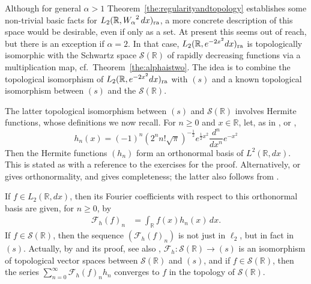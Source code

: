 \documentclass[12pt, reqno]{amsart}
\numberwithin{equation}{section}
\theoremstyle{plain}
\theoremstyle{definition}
\begin{document}
Although for general $\alpha>1$ Theorem~\ref{the:regularityandtopology} establishes some non-trivial basic facts for ${L_2({{\mathbb R}},{W_\alpha}^2\,dx)_{\textup{ra}}}$, a more concrete description of this space would be desirable, even if only as a set. At present this seems out of reach, but there is an exception if $\alpha=2$. In that case, ${L_2({{\mathbb R}},e^{-2x^2}dx)_{\textup{ra}}}$ is topologically isomorphic with the Schwartz space ${{\mathcal S}}({{\mathbb R}})$ of rapidly decreasing functions via a multiplication map, cf.\ Theorem~\ref{the:alphaistwo}. The idea is to combine the topological isomorphism of ${L_2({{\mathbb R}},e^{-2x^2}dx)_{\textup{ra}}}$ with $(s)$ and a known topological isomorphism between $(s)$ and the ${{\mathcal S}}({{\mathbb R}})$.

The latter topological isomorphism between $(s)$ and ${{\mathcal S}}({{\mathbb R}})$ involves Hermite functions, whose definitions we now recall.
For $n\geq 0$ and $x\in{{\mathbb R}}$, let, as in \cite[p.~142]{ReeSim}, or \cite[(1.1.2) and (1.1.18)]{Tha},
\begin{equation}\label{eq:hermitefunctionsdef}
h_n(x)=(-1)^n\left( 2^n n! \sqrt{\pi} \right)^{-\frac{1}{2}}e^{\frac{1}{2}x^2}\frac{d^n}{dx^n}e^{-x^2}
\end{equation}
Then the Hermite functions ${({h_n})}$ form an orthonormal basis of $L^2({{\mathbb R}},dx)$. This is stated as \cite[Lemma~V.3]{ReeSim} with a reference to the exercises for the proof. Alternatively, \cite[22.2.14]{AbrSte} or \cite[(5.5.1)]{Sze} gives orthonormality, and \cite[(5.7.2)]{Sze} gives completeness; the latter also follows from \cite[Corollary~6.34]{Jeu}.

If $f\in  {L_2({{\mathbb R}},dx)}$, then its Fourier coefficients with respect to this orthonormal basis are given, for $n\geq 0$, by
\begin{align*}\label{eq:transformfunctionsHermite}
{{\mathcal F}_h}(f)_n&=\int_{{\mathbb R}} f(x)h_n(x)\,dx.
\end{align*}
If $f\in{{\mathcal S}}({{\mathbb R}})$, then the sequence ${({{{\mathcal F}_h}(f)_n})}$ is not just in $\ell_2$, but in fact in $(s)$. Actually, by \cite[Theorem~V.13]{ReeSim} and its proof, see also \cite[p.~262]{Schw}, ${{\mathcal F}_h}:{{\mathcal S}}({{\mathbb R}})\to (s)$ is an isomorphism of topological vector spaces between ${{\mathcal S}}({{\mathbb R}})$ and $(s)$, and if $f\in{{\mathcal S}}({{\mathbb R}})$, then the series $\sum_{n=0}^\infty {{\mathcal F}_h}(f)_nh_n$ converges to $f$ in the topology of ${{\mathcal S}}({{\mathbb R}})$.
\end{document}
